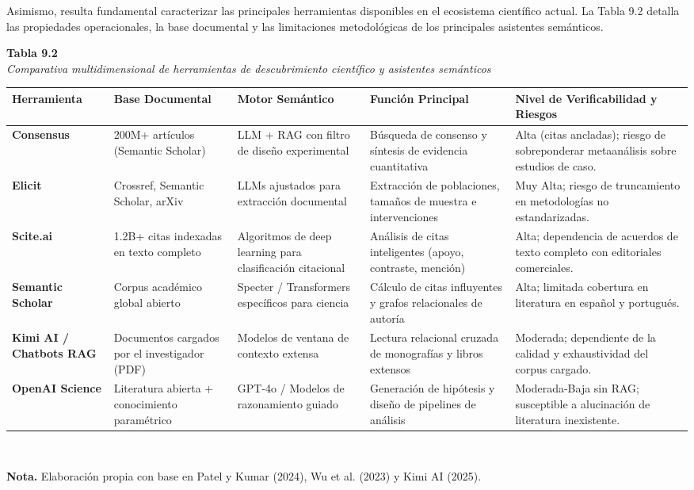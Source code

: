Asimismo, resulta fundamental caracterizar las principales herramientas disponibles en el ecosistema científico actual. La Tabla 9.2 detalla las propiedades operacionales, la base documental y las limitaciones metodológicas de los principales asistentes semánticos.

\begin{table}[htpb!]
    \centering
    \small\sffamily
    \raggedright
    \textbf{Tabla 9.2}\\
    \textit{Comparativa multidimensional de herramientas de descubrimiento científico y asistentes semánticos}\\[0.2cm]
    \centering
    \scriptsize
    \renewcommand{\arraystretch}{1.3}
    \begin{tabularx}{\textwidth}{>{\raggedright\arraybackslash\bfseries}p{2.3cm} >{\raggedright\arraybackslash}p{2.3cm} >{\raggedright\arraybackslash}p{2.5cm} >{\raggedright\arraybackslash}p{3.2cm} >{\raggedright\arraybackslash}X}
    \toprule
    \textbf{Herramienta} & \textbf{Base Documental} & \textbf{Motor Semántico} & \textbf{Función Principal} & \textbf{Nivel de Verificabilidad y Riesgos} \\
    \midrule
    \textbf{Consensus} & 200M+ artículos (Semantic Scholar) & LLM + RAG con filtro de diseño experimental & Búsqueda de consenso y síntesis de evidencia cuantitativa & Alta (citas ancladas); riesgo de sobreponderar metaanálisis sobre estudios de caso. \\
    \textbf{Elicit} & Crossref, Semantic Scholar, arXiv & LLMs ajustados para extracción documental & Extracción de poblaciones, tamaños de muestra e intervenciones & Muy Alta; riesgo de truncamiento en metodologías no estandarizadas. \\
    \textbf{Scite.ai} & 1.2B+ citas indexadas en texto completo & Algoritmos de deep learning para clasificación citacional & Análisis de citas inteligentes (apoyo, contraste, mención) & Alta; dependencia de acuerdos de texto completo con editoriales comerciales. \\
    \textbf{Semantic Scholar} & Corpus académico global abierto & Specter / Transformers específicos para ciencia & Cálculo de citas influyentes y grafos relacionales de autoría & Alta; limitada cobertura en literatura en español y portugués. \\
    \textbf{Kimi AI / Chatbots RAG} & Documentos cargados por el investigador (PDF) & Modelos de ventana de contexto extensa & Lectura relacional cruzada de monografías y libros extensos & Moderada; dependiente de la calidad y exhaustividad del corpus cargado. \\
    \textbf{OpenAI Science} & Literatura abierta + conocimiento paramétrico & GPT-4o / Modelos de razonamiento guiado & Generación de hipótesis y diseño de pipelines de análisis & Moderada-Baja sin RAG; susceptible a alucinación de literatura inexistente. \\
    \bottomrule
    \end{tabularx}\\[0.15cm]
    \raggedright
    \scriptsize \textbf{Nota.} Elaboración propia con base en Patel y Kumar (2024), Wu et al. (2023) y Kimi AI (2025).
\end{table}
